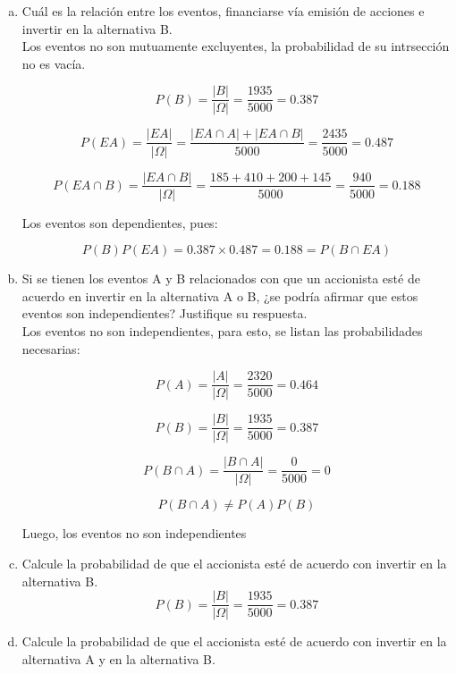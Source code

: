 \documentclass[11pt, spanish]{article}
\begin{document}
\begin{enumerate}[(a)]
\item Cuál es la relación entre los eventos, financiarse vía emisión de acciones e invertir en la alternativa B.\\

Los eventos no son mutuamente excluyentes, la probabilidad de su intrsección no es vacía.

$$P(B) = \frac{\left| B \right|}{\left| \Omega \right|} = \frac{1935}{5000} = 0.387$$

$$P(EA) = \frac{\left|  EA \right|}{\left| \Omega \right|} = \frac{\left|  EA \cap A \right| + \left|  EA \cap B \right|}{5000} = \frac{2435}{5000} = 0.487$$

$$P(EA \cap B) = \frac{\left|  EA \cap B \right|}{\left| \Omega \right|} = \frac{185 + 410 + 200 + 145}{5000} = \frac{940}{5000} = 0.188$$

Los eventos son dependientes, pues:

$$P(B)P(EA) = 0.387 \times 0.487 = 0.188 = P(B \cap EA)$$

\item Si se tienen los eventos A y B relacionados con que un accionista esté de acuerdo en invertir en la alternativa A o B, ¿se podría afirmar que estos eventos son independientes? Justifique su respuesta.\\

Los eventos no son independientes, para esto, se listan las probabilidades necesarias:

$$P(A) = \frac{\left| A \right|}{\left| \Omega \right|} = \frac{2320}{5000} = 0.464$$

$$P(B) = \frac{\left| B \right|}{\left| \Omega \right|} = \frac{1935}{5000} = 0.387$$

$$P(B \cap A) = \frac{\left| B \cap A \right|}{\left| \Omega \right|} = \frac{0}{5000} = 0$$

$$P(B \cap A) \neq P(A)P(B)$$

Luego, los eventos no son independientes

\item Calcule la probabilidad de que el accionista esté de acuerdo con invertir en la alternativa B.\\

$$P(B) = \frac{\left| B \right|}{\left| \Omega \right|} = \frac{1935}{5000} = 0.387$$

\item Calcule la probabilidad de que el accionista esté de acuerdo con invertir en la alternativa A y en la alternativa B.\\


\end{enumerate}
\end{document}
